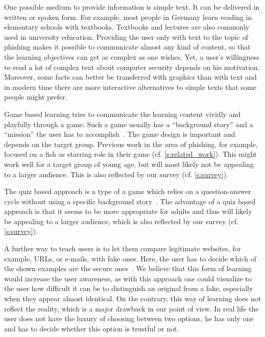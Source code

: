 \begin{description}[leftmargin=0cm]
    \item[Simple Text:] One possible medium to provide information is simple text. It can be delivered in written or spoken form. For example, most people in Germany learn reading in elementary schools with textbooks. 
Textbooks and lectures are also commonly used in university education.
 Providing the user only with text to the topic of phishing makes it possible to communicate almost any kind of content, so that the learning objectives can get as complex as one wishes.
Yet, a user's willingness to read a lot of complex text about computer security depends on his motivation. 
 Moreover, some facts can better be transferred with graphics than with text and in modern time there are more interactive alternatives to simple texts that some people might prefer.
    
	\item[Game Based Learning:] Game based learning tries to communicate the learning content vividly and playfully through a game.
 Such a game usually has a ``background story'' and a ``mission'' the user has to accomplish~\cite{sheng2007antiphishingphil,antiphishingphyllis}. The game design is important and depends on the target group.
 Previous work in the area of phishing, for example, focused on a fish as starring role in their game (cf. \autoref{s:related_work}). This might work well for a target group of young age, but will most likely not be appealing to a larger audience.
 This is also reflected by our survey (cf. \autoref{s:survey}).
	\item[Quiz Based Learning] The quiz based approach is a type of a game which relies on a question-answer cycle without using a specific background story~\cite{onguardonline}. The advantage of a quiz based approach is that it seems to be more appropriate for adults and thus will likely be appealing to a larger audience, which is also reflected by our survey (cf. \autoref{s:survey}).

	\item[Comparison Based Learning:] A further way to teach users is to let them compare legitimate websites, for example, URLs, or e-mails, with fake ones.
 Here, the user has to decide which of the shown examples are the secure ones~\cite{staysafeonline}. 
We believe that this form of learning would increase the user awareness, as with this approach one could visualize to the user how difficult it can be to distinguish an original from a fake, especially when they appear almost identical.
 On the contrary, this way of learning does not reflect the reality, which is a major drawback in our point of view.
 In real life the user does not have the luxury of choosing between two options, he has only one and has to decide whether this option is trustful or not.


\end{description}
